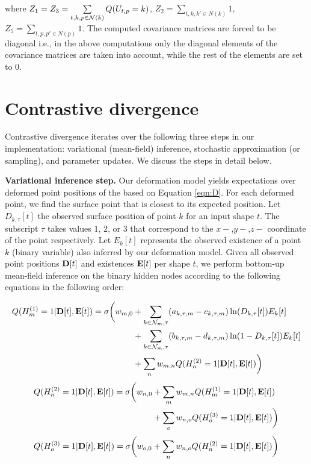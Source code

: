 where $Z_1=Z_3=\sum\limits_{t,k,p \in \mathcal{N}(k)} Q(U_{t,p} = k)$, $Z_2=\sum\limits_{t,k,k' \in N(k)} 1$, $Z_5=\sum\limits_{t,p,p' \in N(p)} 1$. The computed covariance matrices are forced to be diagonal i.e., in the above computations only the diagonal elements of the covariance matrices are taken into account, while the rest of the elements are set to $0$. 


\section{Contrastive divergence}

Contrastive divergence iterates over the following three steps in our implementation: variational (mean-field) inference, stochastic approximation (or sampling), and parameter updates. We discuss the steps in detail below. 

\textbf{Variational inference step.} 
Our deformation model yields expectations over deformed point positions of the  based on Equation \ref{eqn:D}. For each deformed point, we find the surface point that is closest to its expected position. Let $D_{k,\tau}[t]$ the observed surface position of point $k$ for an input shape $t$. The subscript $\tau$ takes values $1$, $2$, or $3$ that correspond to the $x-$,$y-$,$z-$ coordinate of the point respectively. Let $E_{k}[t]$ represents the observed existence of a point $k$ (binary variable) also inferred by our deformation model. Given all observed point positions  $\mathbf{D}[t]$ and existences $\mathbf{E}[t]$ per shape $t$, we perform bottom-up mean-field inference on the binary hidden nodes according to the following equations in the following order:

\begin{align*}
Q( H_m^{(1)} = 1 | \mathbf{D}[t], \mathbf{E}[t] ) =
\sigma \bigg( w_{m, 0} & + \sum\limits_{k \in \mathcal{N}_m,\tau} (  a_{k,\tau,m} - c_{k,\tau,m} ) \ln(D_{k,\tau}[t]) E_k[t] \\
& + \sum\limits_{k \in \mathcal{N}_m,\tau} (  b_{k,\tau,m} - d_{k,\tau,m} ) \ln(1 - D_{k,\tau}[t]) E_k[t] \\
& +  \sum\limits_{n} w_{m, n} Q( H_n^{(2)} = 1 | \mathbf{D}[t], \mathbf{E}[t] ) \bigg)
\end{align*}
\begin{align*}
Q( H_n^{(2)} = 1 | \mathbf{D}[t], \mathbf{E}[t] ) = \sigma \bigg( w_{n, 0} & + 
 \sum\limits_{m} w_{m, n} Q( H_m^{(1)} = 1 | \mathbf{D}[t], \mathbf{E}[t] ) \\
& + \sum\limits_{o} w_{n, o} Q( H_o^{(3)} = 1 | \mathbf{D}[t], \mathbf{E}[t] ) \bigg)
\end{align*}
\begin{align*}
Q( H_o^{(3)} = 1 | \mathbf{D}[t], \mathbf{E}[t] ) = \sigma \bigg( w_{o, 0} + \sum\limits_{n} w_{n, o} Q( H_n^{(2)} = 1 | \mathbf{D}[t], \mathbf{E}[t] ) \bigg)
\end{align*}

